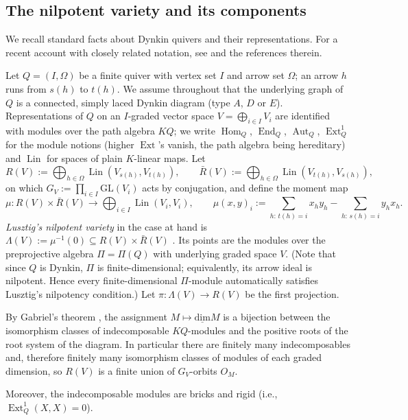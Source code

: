 \documentclass[12pt]{article}
\newcommand{\Hom}{\operatorname{Hom}}
\newcommand{\Ext}{\operatorname{Ext}}
\newcommand{\End}{\operatorname{End}}
\newcommand{\Aut}{\operatorname{Aut}}
\newcommand{\Lin}{\operatorname{Lin}}
\newcommand{\dimv}{\operatorname{\underline{dim}}}
\begin{document}
\subsection{The nilpotent variety and its components}

We recall standard facts about Dynkin quivers and their representations. 
For a recent account with closely related notation, see \cite{MR4847234} and the references therein.

Let $Q=(I,\Omega)$ be a finite quiver with vertex set $I$ and arrow set
$\Omega$; an arrow $h$ runs from $s(h)$ to $t(h)$.  We assume
throughout that the underlying graph of $Q$ is a connected, simply laced
Dynkin diagram (type $A$, $D$ or $E$).  Representations of $Q$ on
an $I$-graded vector space $V=\bigoplus_{i\in I}V_i$ are identified
with modules over the path algebra $KQ$; we write $\Hom_Q$,
$\End_Q$, $\Aut_Q$, $\Ext^1_Q$ for the module notions (higher
$\Ext$'s vanish, the path algebra being hereditary) and $\Lin$ for
spaces of plain $K$-linear maps.  Let
\[
R(V):=\bigoplus_{h\in\Omega}\Lin(V_{s(h)},V_{t(h)}),\qquad
\bar R(V):=\bigoplus_{h\in\Omega}\Lin(V_{t(h)},V_{s(h)}),
\]
on which $G_V:=\prod_{i\in I}\mathrm{GL}(V_i)$ acts by conjugation, and define the moment map
\[
\mu\colon R(V)\times\bar R(V)\to\bigoplus_{i\in I}\Lin(V_i,V_i),
\qquad
\mu(x,y)_i:=\sum_{h:\,t(h)=i}x_hy_h-\sum_{h:\,s(h)=i}y_hx_h .
\]
\emph{Lusztig's nilpotent variety} in the case at hand is $\Lambda(V):=\mu^{-1}(0)\subseteq R(V)\times\bar R(V)$ \cite{MR1088333}.
Its points are the modules over the preprojective algebra $\Pi=\Pi(Q)$ with underlying graded space $V$. 
(Note that since $Q$ is Dynkin, $\Pi$ is finite-dimensional; equivalently, its arrow ideal is nilpotent.
Hence every finite-dimensional $\Pi$-module automatically satisfies Lusztig's nilpotency condition.)
Let $\pi\colon\Lambda(V)\to R(V)$ be the first projection.

By Gabriel's theorem \cite{MR0332887}, the assignment $M\mapsto\dimv M$ is a
bijection between the isomorphism classes of indecomposable
$KQ$-modules and the positive roots of the root system of the diagram.
In particular there are finitely many indecomposables and,
therefore finitely many isomorphism classes of modules of each graded dimension, so $R(V)$ is a finite union of $G_V$-orbits $O_M$.



Moreover, the indecomposable modules are bricks and rigid (i.e., $\Ext^1_Q(X,X)=0$).
\end{document}
